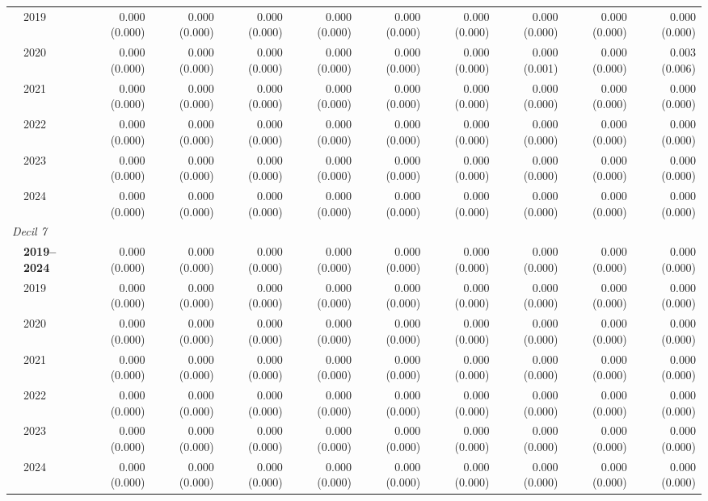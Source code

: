 \begin{table}[htbp]
\begin{tabular}{llrrrrrrrrr}
 & 2019 & 0.000 (0.000) & 0.000 (0.000) & 0.000 (0.000) & 0.000 (0.000) & 0.000 (0.000) & 0.000 (0.000) & 0.000 (0.000) & 0.000 (0.000) & 0.000 (0.000) \\
 & 2020 & 0.000 (0.000) & 0.000 (0.000) & 0.000 (0.000) & 0.000 (0.000) & 0.000 (0.000) & 0.000 (0.000) & 0.000 (0.001) & 0.000 (0.000) & 0.003 (0.006) \\
 & 2021 & 0.000 (0.000) & 0.000 (0.000) & 0.000 (0.000) & 0.000 (0.000) & 0.000 (0.000) & 0.000 (0.000) & 0.000 (0.000) & 0.000 (0.000) & 0.000 (0.000) \\
 & 2022 & 0.000 (0.000) & 0.000 (0.000) & 0.000 (0.000) & 0.000 (0.000) & 0.000 (0.000) & 0.000 (0.000) & 0.000 (0.000) & 0.000 (0.000) & 0.000 (0.000) \\
 & 2023 & 0.000 (0.000) & 0.000 (0.000) & 0.000 (0.000) & 0.000 (0.000) & 0.000 (0.000) & 0.000 (0.000) & 0.000 (0.000) & 0.000 (0.000) & 0.000 (0.000) \\
 & 2024 & 0.000 (0.000) & 0.000 (0.000) & 0.000 (0.000) & 0.000 (0.000) & 0.000 (0.000) & 0.000 (0.000) & 0.000 (0.000) & 0.000 (0.000) & 0.000 (0.000) \\
\midrule
\multicolumn{11}{l}{\textit{Decil 7}} \\
 & \textbf{2019–2024} & 0.000 (0.000) & 0.000 (0.000) & 0.000 (0.000) & 0.000 (0.000) & 0.000 (0.000) & 0.000 (0.000) & 0.000 (0.000) & 0.000 (0.000) & 0.000 (0.000) \\
 & 2019 & 0.000 (0.000) & 0.000 (0.000) & 0.000 (0.000) & 0.000 (0.000) & 0.000 (0.000) & 0.000 (0.000) & 0.000 (0.000) & 0.000 (0.000) & 0.000 (0.000) \\
 & 2020 & 0.000 (0.000) & 0.000 (0.000) & 0.000 (0.000) & 0.000 (0.000) & 0.000 (0.000) & 0.000 (0.000) & 0.000 (0.000) & 0.000 (0.000) & 0.000 (0.000) \\
 & 2021 & 0.000 (0.000) & 0.000 (0.000) & 0.000 (0.000) & 0.000 (0.000) & 0.000 (0.000) & 0.000 (0.000) & 0.000 (0.000) & 0.000 (0.000) & 0.000 (0.000) \\
 & 2022 & 0.000 (0.000) & 0.000 (0.000) & 0.000 (0.000) & 0.000 (0.000) & 0.000 (0.000) & 0.000 (0.000) & 0.000 (0.000) & 0.000 (0.000) & 0.000 (0.000) \\
 & 2023 & 0.000 (0.000) & 0.000 (0.000) & 0.000 (0.000) & 0.000 (0.000) & 0.000 (0.000) & 0.000 (0.000) & 0.000 (0.000) & 0.000 (0.000) & 0.000 (0.000) \\
 & 2024 & 0.000 (0.000) & 0.000 (0.000) & 0.000 (0.000) & 0.000 (0.000) & 0.000 (0.000) & 0.000 (0.000) & 0.000 (0.000) & 0.000 (0.000) & 0.000 (0.000) \\

\end{tabular}
\end{table}
